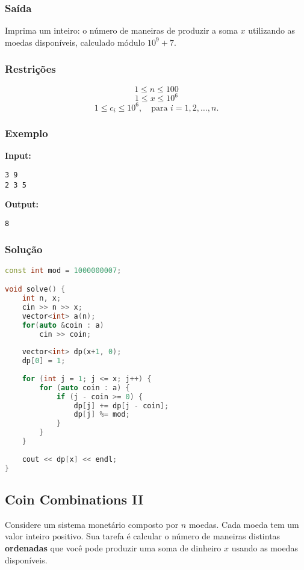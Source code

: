 \subsubsection*{Saída}
Imprima um inteiro: o número de maneiras de produzir a soma \( x \) utilizando as moedas disponíveis, calculado módulo \( 10^9+7 \).

\subsubsection*{Restrições}
\[
1 \le n \le 100
\]
\[
1 \le x \le 10^6
\]
\[
1 \le c_i \le 10^6,\quad \text{para } i = 1, 2, \dots, n.
\]

\subsubsection*{Exemplo}

\textbf{Input:}
\begin{verbatim}
3 9
2 3 5
\end{verbatim}

\textbf{Output:}
\begin{verbatim}
8
\end{verbatim}

\subsubsection*{Solução}
\begin{lstlisting}[language=C++]
const int mod = 1000000007;

void solve() {
    int n, x;
    cin >> n >> x;
    vector<int> a(n);
    for(auto &coin : a)
        cin >> coin;
    
    vector<int> dp(x+1, 0);
    dp[0] = 1;
    
    for (int j = 1; j <= x; j++) {
        for (auto coin : a) {
            if (j - coin >= 0) {
                dp[j] += dp[j - coin];
                dp[j] %= mod;
            }
        }
    }
    
    cout << dp[x] << endl;
}

\end{lstlisting}

\subsection{Coin Combinations II}
Considere um sistema monetário composto por \( n \) moedas. Cada moeda tem um valor inteiro positivo. Sua tarefa é calcular o número de maneiras distintas \textbf{ordenadas} que você pode produzir uma soma de dinheiro \( x \) usando as moedas disponíveis.

